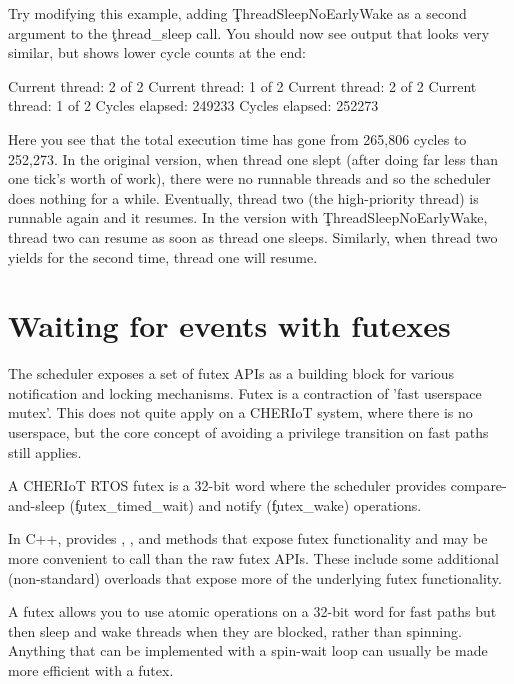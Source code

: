 Try modifying this example, adding \c{ThreadSleepNoEarlyWake}  as a second argument to the \c{thread_sleep} call.
You should now see output that looks very similar, but shows lower cycle counts at the end:

\begin{console}
Current thread: 2 of 2
Current thread: 1 of 2
Current thread: 2 of 2
Current thread: 1 of 2
Cycles elapsed: 249233
Cycles elapsed: 252273
\end{console}

Here you see that the total execution time has gone from 265,806 cycles to 252,273.
In the original version, when thread one slept (after doing far less than one tick's worth of work), there were no runnable threads and so the scheduler does nothing for a while.
Eventually, thread two (the high-priority thread) is runnable again and it resumes.
In the version with \c{ThreadSleepNoEarlyWake}, thread two can resume as soon as thread one sleeps.
Similarly, when thread two yields for the second time, thread one will resume.

\section[label=futex]{Waiting for events with futexes}

The scheduler exposes a set of futex APIs as a building block for various notification and locking mechanisms.
Futex is a contraction of 'fast userspace mutex'.
This does not quite apply on a CHERIoT system, where there is no userspace, but the core concept of avoiding a privilege transition on fast paths still applies.

A CHERIoT RTOS futex is a 32-bit word where the scheduler provides compare-and-sleep (\c{futex_timed_wait}) and notify (\c{futex_wake}) operations.



\begin{note}
	In C++,  provides , , and  methods that expose futex functionality and may be more convenient to call than the raw futex APIs.
	These include some additional (non-standard) overloads that expose more of the underlying futex functionality.
\end{note}

A futex allows you to use atomic operations on a 32-bit word for fast paths but then sleep and wake threads when they are blocked, rather than spinning.
Anything that can be implemented with a spin-wait loop can usually be made more efficient with a futex.


